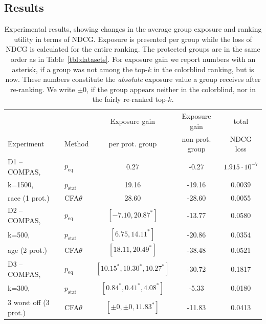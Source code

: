 \subsection{Results}\label{sec:experiments-results}
%
\begin{table}[t!]
	\caption{Experimental results, showing changes in the average group exposure and ranking utility in terms of NDCG.
		Exposure is presented per group while the loss of NDCG is calculated for the entire ranking.
		The protected groups are in the same order as in Table~\ref{tbl:datasets}.
		For exposure gain we report numbers with an asterisk, if a group was not among the top-$k$ in the colorblind ranking, but is now.
		These numbers constitute the \emph{absolute} exposure value a group receives after re-ranking.
		We write $\pm 0$, if the group appears neither in the colorblind, nor in the fairly re-ranked top-$k$.
		\label{tbl:results-part-one}
	}
	\vspace{-4mm}
	\centering\begin{tabular}{llccc}\toprule
   					&			& Exposure gain 	& Exposure gain		&   total   \\
		Experiment	& Method 	& per prot. group 	& non-prot. group 	& NDCG loss  \\

		\midrule
		D1 -- COMPAS,	& \algoFAIR $p_{\text{eq}}$ 	& 0.27 	& -0.27 	& $1.915\cdot10^{-7}$ \\
		k=1500, 		& \algoFAIR $p_{\text{stat}}$	& 19.16 & -19.16 	& 0.0039 \\
		race (1 prot.)	& CFA$\theta$ 					& 28.60 & -28.60	& 0.0055 \\

		\midrule
		D2 -- COMPAS, 	& \algoFAIR $p_{\text{eq}}$ 	& $[-7.10, 20.87^*]$ 	& -13.77 	& 0.0580 \\
		k=500, 			& \algoFAIR $p_{\text{stat}}$ 	& $[6.75, 14.11^*]$ 	& -20.86 	& 0.0354 \\
		age (2 prot.)	& CFA$\theta$ 					& $[18.11, 20.49^*]$ 	& -38.48	& 0.0521 \\ %

		\midrule
		D3 -- COMPAS, 			& \algoFAIR  $p_{\text{eq}}$ 	& $[10.15^*, 10.30^*, 10.27^*]$ & -30.72	& 0.1817 \\
		k=300, 					& \algoFAIR  $p_{\text{stat}}$ 	& $[0.84^*, 0.41^*, 4.08^*]$ 	& -5.33		& 0.0180 \\
		3 worst off (3 prot.) 	& CFA$\theta$ 					& $[\pm 0, \pm 0, 11.83^*]$	 	& -11.83	& 0.0413 \\


\end{tabular}
\end{table}
